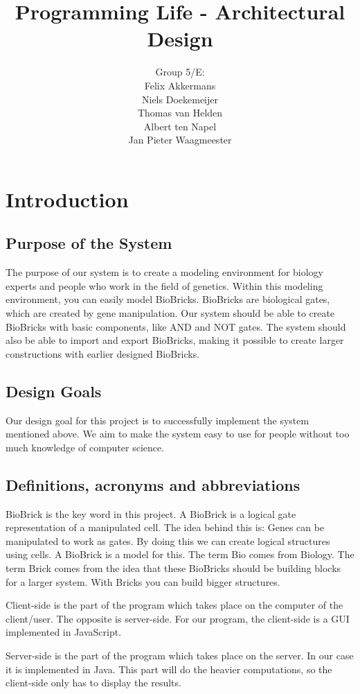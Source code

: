 \documentclass[a4paper]{article}
\title{Programming Life - Architectural Design }
\author{Group 5/E:\\
Felix Akkermans \\
Niels Doekemeijer \\
Thomas van Helden \\
Albert ten Napel \\
Jan Pieter Waagmeester}
\begin{document}
\maketitle

\vfill

\small{\tableofcontents}
\pagebreak
\section{Introduction}
\subsection{Purpose of the System}
The purpose of our system is to create a modeling environment for biology experts and people who work in the field of genetics. Within this modeling environment, you can easily model BioBricks. BioBricks are biological gates, which are created by gene manipulation. Our system should be able to create BioBricks with basic components, like AND and NOT gates. The system should also be able to import and export BioBricks, making it possible to create larger constructions with earlier designed BioBricks.
\subsection{Design Goals}
Our design goal for this project is to successfully implement the system mentioned above. We aim to make the system easy to use for people without too much knowledge of computer science.
\subsection{Definitions, acronyms and abbreviations}
BioBrick is the key word in this project. A BioBrick is a logical gate representation of a manipulated cell. The idea behind this is: Genes can be manipulated to work as gates. By doing this we can create logical structures using cells. A BioBrick is a model for this. The term Bio comes from Biology. The term Brick comes from the idea that these BioBricks should be building blocks for a larger system. With Bricks you can build bigger structures. 

Client-side is the part of the program which takes place on the computer of the client/user. The opposite is server-side. For our program, the client-side is a GUI implemented in JavaScript. 

Server-side is the part of the program which takes place on the server. In our case it is implemented in Java. This part will do the heavier computations, so the client-side only has to display the results.
\end{document}
